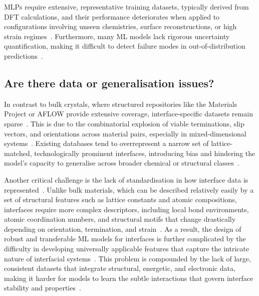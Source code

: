 MLPs require extensive, representative training datasets, typically derived from DFT calculations, and their performance deteriorates when applied to configurations involving unseen chemistries, surface reconstructions, or high strain regimes~\cite{Batzner2022-fd, Owen2024-wp}.
Furthermore, many ML models lack rigorous uncertainty quantification, making it difficult to detect failure modes in out-of-distribution predictions~\cite{Batzner2022-fd, Deng2023-tg}.

\subsection*{Are there data or generalisation issues?}

In contrast to bulk crystals, where structured repositories like the Materials Project or AFLOW provide extensive coverage, interface-specific datasets remain sparse~\nocite{}.
This is due to the combinatorial explosion of viable terminations, slip vectors, and orientations across material pairs, especially in mixed-dimensional systems~\cite{Gerber2023-yd, Deng2023-tg, Leitherer2023-ew}.
Existing databases tend to overrepresent a narrow set of lattice-matched, technologically prominent interfaces, introducing bias and hindering the model's capacity to generalise across broader chemical or structural classes~\cite{Di_Liberto2022-gz, Gerber2023-yd, Davies2024-ju}.

\newpage Another critical challenge is the lack of standardisation in how interface data is represented~\nocite{}.
Unlike bulk materials, which can be described relatively easily by a set of structural features such as lattice constants and atomic compositions, interfaces require more complex descriptors, including local bond environments, atomic coordination numbers, and structural motifs that change drastically depending on orientation, termination, and strain~\cite{Gerber2023-yd, Wang2024-tn}.
As a result, the design of robust and transferable ML models for interfaces is further complicated by the difficulty in developing universally applicable features that capture the intricate nature of interfacial systems~\cite{Uhrin2025-ba, Khot2025-hh}.
This problem is compounded by the lack of large, consistent datasets that integrate structural, energetic, and electronic data, making it harder for models to learn the subtle interactions that govern interface stability and properties~\nocite{}.

